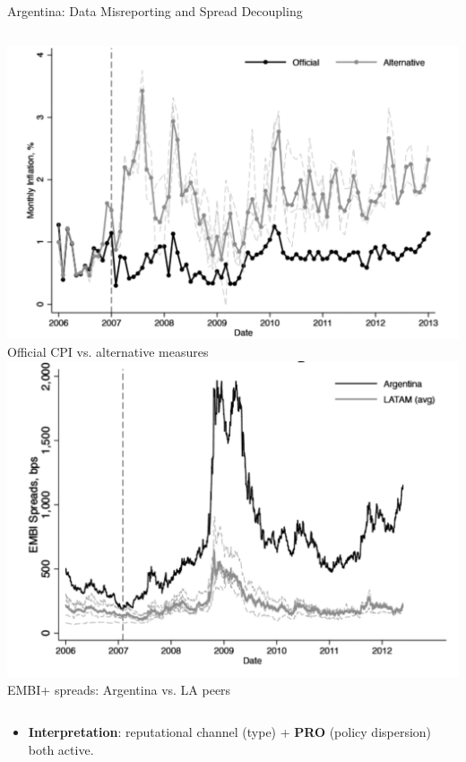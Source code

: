 \documentclass[aspectratio=169,11pt,professionalfonts]{beamer}
\newcommand{\1}{\mathbb{1}}
\begin{document}
\begin{frame}{Argentina: Data Misreporting and Spread Decoupling}
  \begin{columns}[T,onlytextwidth]
    \includegraphics[width=\linewidth]{../../pro-default-model/results/inflation_arg.png}
    \vspace{0.3em}
    {\scriptsize Official CPI vs. alternative measures}
    \includegraphics[width=\linewidth]{../../pro-default-model/results/spread_arg.png}
    \vspace{0.3em}
    {\scriptsize EMBI+ spreads: Argentina vs. LA peers}
  \end{columns}
  \vspace{0.3em}
  \begin{itemize}
    \item \textbf{Interpretation}: reputational channel (type) + \textbf{PRO} (policy dispersion) both active.
  \end{itemize}
\end{frame}
\end{document}
